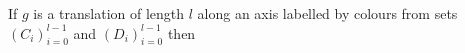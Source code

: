 \documentclass[preview]{standalone}
\begin{document}
\begin{center}
If $g$ is a translation of length $l$ along an axis labelled by colours from sets $(C_i)_{i=0}^{l-1}$ and $(D_i)_{i=0}^{l-1}$ then
\end{center}
\end{document}

